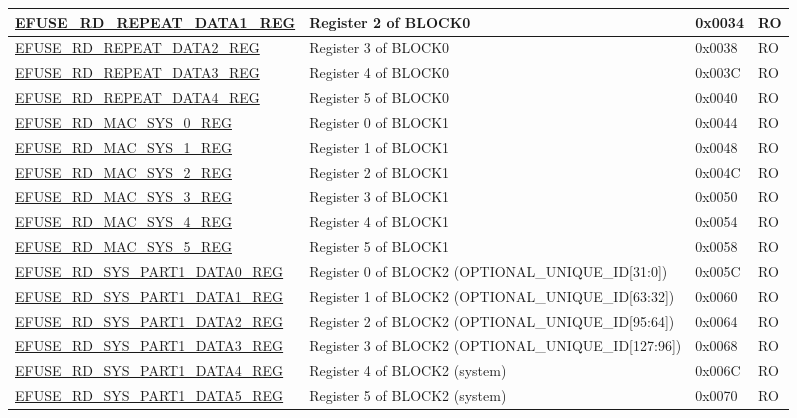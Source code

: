 \begin{longtable}{ | p{5.8cm} | p{7cm} | p{1.3cm} | p{1.2cm} | }
\hyperref[regdesc:EFUSERDREPEATDATA1REG]{EFUSE\_RD\_REPEAT\_DATA1\_REG} & Register 2 of BLOCK0 & 0x0034 & RO \\ \hline
\hyperref[regdesc:EFUSERDREPEATDATA2REG]{EFUSE\_RD\_REPEAT\_DATA2\_REG} & Register 3 of BLOCK0 & 0x0038 & RO \\ \hline
\hyperref[regdesc:EFUSERDREPEATDATA3REG]{EFUSE\_RD\_REPEAT\_DATA3\_REG} & Register 4 of BLOCK0 & 0x003C & RO \\ \hline
\hyperref[regdesc:EFUSERDREPEATDATA4REG]{EFUSE\_RD\_REPEAT\_DATA4\_REG} & Register 5 of BLOCK0 & 0x0040 & RO \\ \hline
\hyperref[regdesc:EFUSERDMACSYS0REG]{EFUSE\_RD\_MAC\_SYS\_0\_REG} & Register 0 of BLOCK1 & 0x0044 & RO \\ \hline
\hyperref[regdesc:EFUSERDMACSYS1REG]{EFUSE\_RD\_MAC\_SYS\_1\_REG} & Register 1 of BLOCK1 & 0x0048 & RO \\ \hline
\hyperref[regdesc:EFUSERDMACSYS2REG]{EFUSE\_RD\_MAC\_SYS\_2\_REG} & Register 2 of BLOCK1 & 0x004C & RO \\ \hline
\hyperref[regdesc:EFUSERDMACSYS3REG]{EFUSE\_RD\_MAC\_SYS\_3\_REG} & Register 3 of BLOCK1 & 0x0050 & RO \\ \hline
\hyperref[regdesc:EFUSERDMACSYS4REG]{EFUSE\_RD\_MAC\_SYS\_4\_REG} & Register 4 of BLOCK1 & 0x0054 & RO \\ \hline
\hyperref[regdesc:EFUSERDMACSYS5REG]{EFUSE\_RD\_MAC\_SYS\_5\_REG} & Register 5 of BLOCK1 & 0x0058 & RO \\ \hline
\hyperref[regdesc:EFUSERDSYSPART1DATA0REG]{EFUSE\_RD\_SYS\_PART1\_DATA0\_REG} & Register 0 of BLOCK2 (OPTIONAL\_UNIQUE\_ID[31:0]) & 0x005C & RO \\ \hline
\hyperref[regdesc:EFUSERDSYSPART1DATA1REG]{EFUSE\_RD\_SYS\_PART1\_DATA1\_REG} & Register 1 of BLOCK2 (OPTIONAL\_UNIQUE\_ID[63:32]) & 0x0060 & RO \\ \hline
\hyperref[regdesc:EFUSERDSYSPART1DATA2REG]{EFUSE\_RD\_SYS\_PART1\_DATA2\_REG} & Register 2 of BLOCK2 (OPTIONAL\_UNIQUE\_ID[95:64]) & 0x0064 & RO \\ \hline
\hyperref[regdesc:EFUSERDSYSPART1DATA3REG]{EFUSE\_RD\_SYS\_PART1\_DATA3\_REG} & Register 3 of BLOCK2 (OPTIONAL\_UNIQUE\_ID[127:96]) & 0x0068 & RO \\ \hline
\hyperref[regdesc:EFUSERDSYSPART1DATA4REG]{EFUSE\_RD\_SYS\_PART1\_DATA4\_REG} & Register 4 of BLOCK2 (system) & 0x006C & RO \\ \hline
\hyperref[regdesc:EFUSERDSYSPART1DATA5REG]{EFUSE\_RD\_SYS\_PART1\_DATA5\_REG} & Register 5 of BLOCK2 (system) & 0x0070 & RO \\ \hline

\end{longtable}
